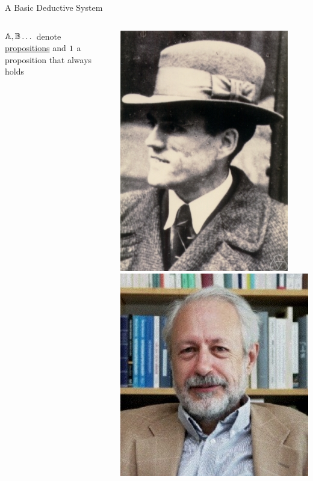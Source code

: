 \documentclass{beamer}
\begin{document}
\begin{slide}{A Basic Deductive System}
  \begin{minipage}[0.3\textheight]{\textwidth}
  \begin{columns}[c]
  \begin{column}{0.5\textwidth}
          $\mathbb{A},\mathbb{B} \dots$ denote \alert{\underline{propositions}}
          and $1$ a proposition that always holds   
  \end{column}
  \begin{column}{0.45\textwidth}
        \includegraphics[scale=0.2]{images/gentzen.jpg}
        \includegraphics[scale=0.16]{images/prawitz.jpg}
  \end{column}
  \end{columns}
  \end{minipage}


\end{slide}
\end{document}
